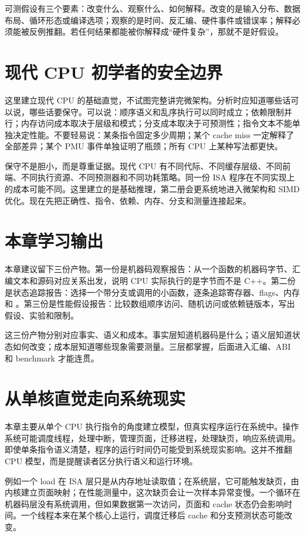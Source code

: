 可测假设有三个要素：改变什么、观察什么、如何解释。改变的是输入分布、数据布局、循环形态或编译选项；观察的是时间、反汇编、硬件事件或错误率；解释必须能被反例推翻。若任何结果都能被你解释成“硬件复杂”，那就不是好假设。

\section{现代 CPU 初学者的安全边界}

这里建立现代 CPU 的基础直觉，不试图完整讲完微架构。分析时应知道哪些话可以说，哪些话要保守。可以说：顺序语义和乱序执行可以同时成立；依赖限制并行；内存访问成本取决于层级和模式；分支成本取决于可预测性；指令文本不能单独决定性能。不要轻易说：某条指令固定多少周期；某个 cache miss 一定解释了全部差异；某个 PMU 事件单独证明了瓶颈；所有 CPU 上某种写法都更快。

保守不是胆小，而是尊重证据。现代 CPU 有不同代际、不同缓存层级、不同前端、不同执行资源、不同预测器和不同功耗策略。同一份 ISA 程序在不同实现上的成本可能不同。这里建立的是基础推理，第二册会更系统地进入微架构和 SIMD 优化。现在先把正确性、指令、依赖、内存、分支和测量连接起来。

\section{本章学习输出}

本章建议留下三份产物。第一份是机器码观察报告：从一个函数的机器码字节、汇编文本和源码对应关系出发，说明 CPU 实际执行的是字节而不是 C++。第二份是状态追踪报告：选择一个带分支或调用的小函数，逐条追踪寄存器、flags、内存和 。第三份是性能假设报告：比较数组顺序访问、随机访问或依赖链版本，写出假设、实验和限制。

这三份产物分别对应事实、语义和成本。事实层知道机器码是什么；语义层知道状态如何改变；成本层知道哪些现象需要测量。三层都掌握，后面进入汇编、ABI 和 benchmark 才能连贯。

\section{从单核直觉走向系统现实}

本章主要从单个 CPU 执行指令的角度建立模型，但真实程序运行在系统中。操作系统可能调度线程，处理中断，管理页面，迁移进程，处理缺页，响应系统调用。即使单条指令语义清楚，程序的运行时间仍可能受到系统现实影响。这并不推翻 CPU 模型，而是提醒读者区分执行语义和运行环境。

例如一个 load 在 ISA 层只是从内存地址读取值；在系统层，它可能触发缺页，由内核建立页面映射；在性能测量中，这次缺页会让一次样本异常变慢。一个循环在机器码层没有系统调用，但如果数据第一次访问，页面和 cache 状态仍会影响时间。一个线程本来在某个核心上运行，调度迁移后 cache 和分支预测状态可能改变。

